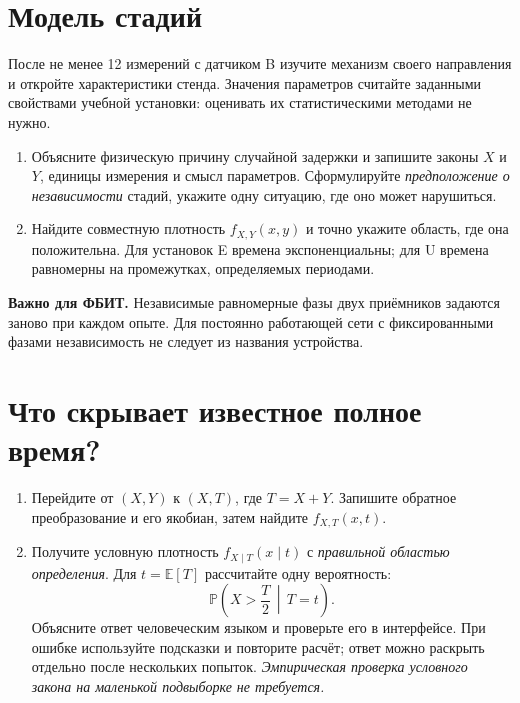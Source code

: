 \documentclass[12pt,a4paper]{article}
\begin{document}
\section{Модель стадий}
После не менее 12 измерений с датчиком B изучите механизм своего направления и откройте характеристики стенда. Значения параметров считайте заданными свойствами учебной установки: оценивать их статистическими методами не нужно.
\begin{enumerate}[resume]
\item Объясните физическую причину случайной задержки и запишите законы \(X\) и \(Y\), единицы измерения и смысл параметров. Сформулируйте \emph{предположение о независимости} стадий, укажите одну ситуацию, где оно может нарушиться.
\item Найдите совместную плотность \(f_{X,Y}(x,y)\) и точно укажите область, где она положительна. Для установок E времена экспоненциальны; для U времена равномерны на промежутках, определяемых периодами.
\end{enumerate}
\begin{studentnote}\textbf{Важно для ФБИТ.} Независимые равномерные фазы двух приёмников задаются заново при каждом опыте. Для постоянно работающей сети с фиксированными фазами независимость не следует из названия устройства.\end{studentnote}

\section{Что скрывает известное полное время?}
\begin{enumerate}[resume]
\item Перейдите от \((X,Y)\) к \((X,T)\), где \(T=X+Y\). Запишите обратное преобразование и его якобиан, затем найдите \(f_{X,T}(x,t)\).
\item Получите условную плотность \(f_{X\mid T}(x\mid t)\) с \emph{правильной областью определения}. Для \(t=\mathbb E[T]\) рассчитайте одну вероятность:
\[
\mathbb P\!\left(X>\frac{T}{2}\,\middle|\,T=t\right).
\]
Объясните ответ человеческим языком и проверьте его в интерфейсе. При ошибке используйте подсказки и повторите расчёт; ответ можно раскрыть отдельно после нескольких попыток. \emph{Эмпирическая проверка условного закона на маленькой подвыборке не требуется.}
\end{enumerate}
\end{document}
